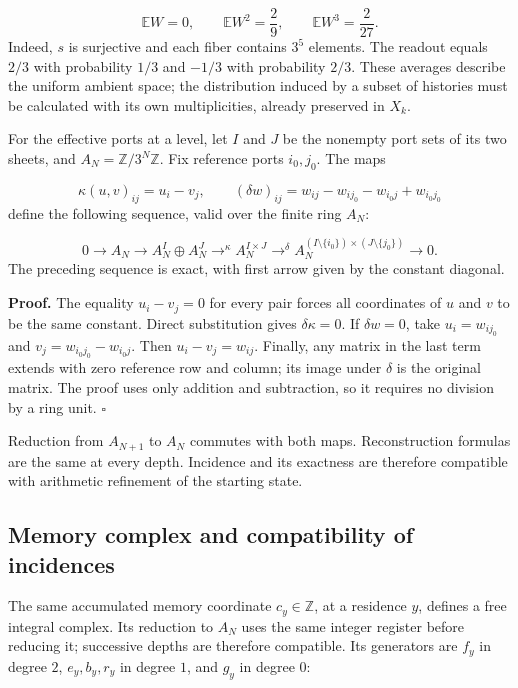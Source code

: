 \[
\mathbb EW=0,\qquad
\mathbb EW^2=\frac29,\qquad
\mathbb EW^3=\frac2{27}.
\]
Indeed, \(s\) is surjective and each fiber contains \(3^5\) elements. The readout equals \(2/3\) with probability \(1/3\) and \(-1/3\) with probability \(2/3\). These averages describe the uniform ambient space; the distribution induced by a subset of histories must be calculated with its own multiplicities, already preserved in \(X_k\).

For the effective ports at a level, let \(I\) and \(J\) be the nonempty port sets of its two sheets, and \(A_N=\mathbb Z/3^N\mathbb Z\). Fix reference ports \(i_0,j_0\). The maps

\[
\kappa(u,v)_{ij}=u_i-v_j,
\qquad
(\delta w)_{ij}=w_{ij}-w_{ij_0}-w_{i_0j}+w_{i_0j_0}
\]
define the following sequence, valid over the finite ring \(A_N\):

\[
0\longrightarrow A_N\longrightarrow
A_N^I\oplus A_N^J\mathrel{\mathop{\longrightarrow}^{\kappa}}
A_N^{I\times J}\mathrel{\mathop{\longrightarrow}^{\delta}}
A_N^{(I\setminus\{i_0\})\times(J\setminus\{j_0\})}
\longrightarrow0.
\]
The preceding sequence is exact, with first arrow given by the constant diagonal.

\textbf{Proof.} The equality \(u_i-v_j=0\) for every pair forces all coordinates of \(u\) and \(v\) to be the same constant. Direct substitution gives \(\delta\kappa=0\). If \(\delta w=0\), take \(u_i=w_{ij_0}\) and \(v_j=w_{i_0j_0}-w_{i_0j}\). Then \(u_i-v_j=w_{ij}\). Finally, any matrix in the last term extends with zero reference row and column; its image under \(\delta\) is the original matrix. The proof uses only addition and subtraction, so it requires no division by a ring unit. \hfill\(\square\)

Reduction from \(A_{N+1}\) to \(A_N\) commutes with both maps. Reconstruction formulas are the same at every depth. Incidence and its exactness are therefore compatible with arithmetic refinement of the starting state.

\subsection{Memory complex and compatibility of incidences}
The same accumulated memory coordinate \(c_y\in\mathbb Z\), at a residence \(y\), defines a free integral complex. Its reduction to \(A_N\) uses the same integer register before reducing it; successive depths are therefore compatible. Its generators are \(f_y\) in degree \(2\), \(e_y,b_y,r_y\) in degree \(1\), and \(g_y\) in degree \(0\):

